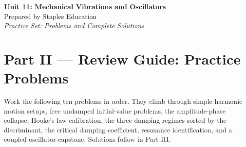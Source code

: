 




\begin{center}
    {\LARGE \bfseries Unit 11: Mechanical Vibrations and Oscillators}\\[6pt]
    {\large Prepared by Staples Education}\\[4pt]
    {\itshape Practice Set: Problems and Complete Solutions}
\end{center}

\vspace{0.4em}

{}
\section*{Part II --- Review Guide: Practice Problems}

Work the following ten problems in order. They climb through simple harmonic motion
setups, free undamped initial-value problems, the amplitude-phase collapse, Hooke's
law calibration, the three damping regimes sorted by the discriminant, the critical
damping coefficient, resonance identification, and a coupled-oscillator capstone.
Solutions follow in Part III.

